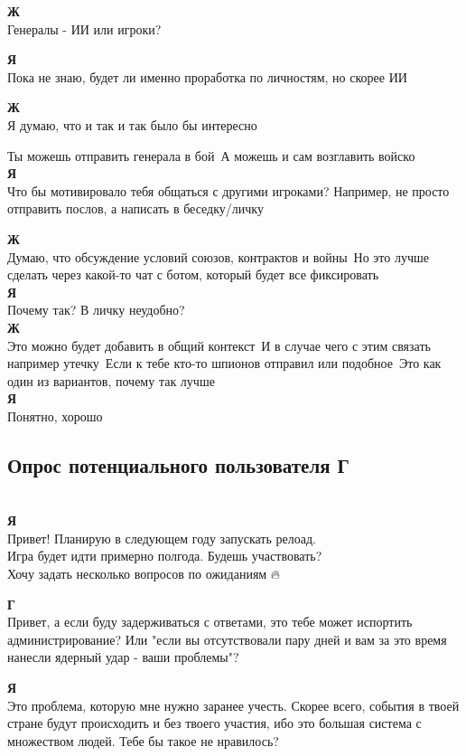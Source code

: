 \textbf{Ж}\\
Генералы - ИИ или игроки?

\textbf{Я}\\
Пока не знаю, будет ли именно проработка по личностям, но скорее ИИ

\textbf{Ж}\\
Я думаю, что и так и так было бы интересно

Ты можешь отправить генерала в бой\
А можешь и сам возглавить войско\\

\textbf{Я}\\
Что бы мотивировало тебя общаться с другими игроками? Например, не просто отправить послов, а написать в беседку/личку

\textbf{Ж}\\
Думаю, что обсуждение условий союзов, контрактов и войны\
Но это лучше сделать через какой-то чат с ботом, который будет все фиксировать\\

\textbf{Я}\\
Почему так? В личку неудобно?\\

\textbf{Ж}\\
Это можно будет добавить в общий контекст\
И в случае чего с этим связать например утечку\
Если к тебе кто-то шпионов отправил или подобное\
Это как один из вариантов, почему так лучше\\

\textbf{Я}\\
Понятно, хорошо

\subsection{Опрос потенциального пользователя Г}\\
\textbf{Я}\\
Привет! Планирую в следующем году запускать релоад.\\
Игра будет идти примерно полгода. Будешь участвовать?\\
Хочу задать несколько вопросов по ожиданиям 🔥🎅

\textbf{Г}\\
Привет, а если буду задерживаться с ответами, это тебе может испортить администрирование? Или "если вы отсутствовали пару дней и вам за это время нанесли ядерный удар - ваши проблемы"?

\textbf{Я}\\
Это проблема, которую мне нужно заранее учесть. Скорее всего, события в твоей стране будут происходить и без твоего участия, ибо это большая система с множеством людей. Тебе бы такое не нравилось?

